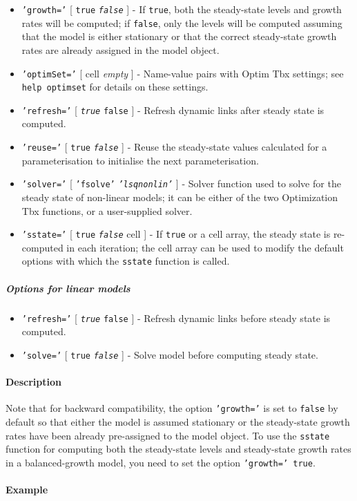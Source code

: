 \begin{itemize}
 \item
   \texttt{'growth='} {[} \texttt{true} \textbar{} \emph{\texttt{false}}
   {]} - If \texttt{true}, both the steady-state levels and growth rates
   will be computed; if \texttt{false}, only the levels will be computed
   assuming that the model is either stationary or that the correct
   steady-state growth rates are already assigned in the model object.
 \item
   \texttt{'optimSet='} {[} cell \textbar{} \emph{empty} {]} - Name-value
   pairs with Optim Tbx settings; see \texttt{help optimset} for details
   on these settings.
 \item
   \texttt{'refresh='} {[} \emph{\texttt{true}} \textbar{} \texttt{false}
   {]} - Refresh dynamic links after steady state is computed.
 \item
   \texttt{'reuse='} {[} \texttt{true} \textbar{} \emph{\texttt{false}}
   {]} - Reuse the steady-state values calculated for a parameterisation
   to initialise the next parameterisation.
 \item
   \texttt{'solver='} {[} \texttt{'fsolve'} \textbar{}
   \emph{\texttt{'lsqnonlin'}} {]} - Solver function used to solve for
   the steady state of non-linear models; it can be either of the two
   Optimization Tbx functions, or a user-supplied solver.
 \item
   \texttt{'sstate='} {[} \texttt{true} \textbar{} \emph{\texttt{false}}
   \textbar{} cell {]} - If \texttt{true} or a cell array, the steady
   state is re-computed in each iteration; the cell array can be used to
   modify the default options with which the \texttt{sstate} function is
   called.
 \end{itemize}
 
 \subparagraph{Options for linear models}
 
 \begin{itemize}
 \item
   \texttt{'refresh='} {[} \emph{\texttt{true}} \textbar{} \texttt{false}
   {]} - Refresh dynamic links before steady state is computed.
 \item
   \texttt{'solve='} {[} \texttt{true} \textbar{} \emph{\texttt{false}}
   {]} - Solve model before computing steady state.
 \end{itemize}
 
 \paragraph{Description}
 
 Note that for backward compatibility, the option \texttt{'growth='} is
 set to \texttt{false} by default so that either the model is assumed
 stationary or the steady-state growth rates have been already
 pre-assigned to the model object. To use the \texttt{sstate} function
 for computing both the steady-state levels and steady-state growth rates
 in a balanced-growth model, you need to set the option
 \texttt{'growth=' true}.
 
 \paragraph{Example}


